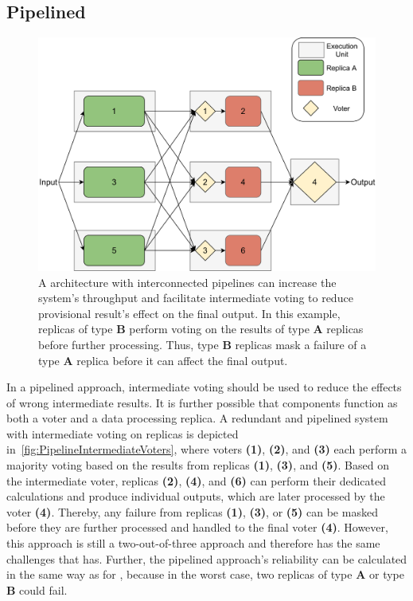 \subsection{Pipelined }
\begin{figure}[!ht]
	\centering
	\includegraphics[width=0.9\linewidth]{images/InterconnectedVoterPipeline}
	\caption{A  architecture with interconnected pipelines can increase the system's throughput and facilitate intermediate voting to reduce provisional result's effect on the final output. In this example, replicas of type \textbf{B} perform voting on the results of type \textbf{A} replicas before further processing. Thus, type \textbf{B} replicas mask a failure of a type \textbf{A} replica before it can affect the final output.}
	\label{fig:PipelineIntermediateVoters}
\end{figure}

In a pipelined approach, intermediate voting should be used to reduce the effects of wrong intermediate results.
It is further possible that components function as both a voter and a data processing replica.
A redundant and pipelined system with intermediate voting on replicas is depicted in~\autoref{fig:PipelineIntermediateVoters}, where voters \textbf{(1)}, \textbf{(2)}, and \textbf{(3)} each perform a majority voting based on the results from replicas \textbf{(1)}, \textbf{(3)}, and \textbf{(5)}.
Based on the intermediate voter, replicas \textbf{(2)}, \textbf{(4)}, and \textbf{(6)} can perform their dedicated calculations and produce individual outputs, which are later processed by the voter \textbf{(4)}.
Thereby, any failure from replicas \textbf{(1)}, \textbf{(3)}, or \textbf{(5)} can be masked before they are further processed and handled to the final voter \textbf{(4)}.
However, this approach is still a two-out-of-three approach and therefore has the same challenges that  has.
Further, the pipelined approach's reliability can be calculated in the same way as for , because in the worst case, two replicas of type \textbf{A} or type \textbf{B} could fail.
\\

